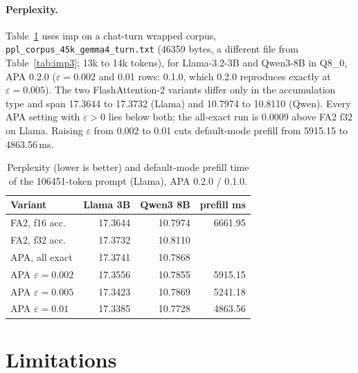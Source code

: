 \documentclass[10pt,twocolumn]{article}
\newcommand{\eps}{\varepsilon}
\newcommand{\code}[1]{\texttt{#1}}
\begin{document}
\paragraph{Perplexity.} Table~\ref{tab:ppl} uses imp on a chat-turn wrapped corpus,
\code{ppl\_corpus\_45k\_gemma4\_turn.txt} (46359 bytes, a different file from Table~\ref{tab:imp3}; 13k to 14k tokens), for Llama-3.2-3B
and Qwen3-8B \cite{yang2025qwen3} in Q8\_0, APA 0.2.0 ($\eps=0.002$ and 0.01 rows: 0.1.0, which 0.2.0
reproduces exactly at $\eps=0.005$). The two FlashAttention-2 variants differ only in the accumulation type
and span 17.3644 to 17.3732 (Llama) and 10.7974 to 10.8110 (Qwen). Every APA setting with $\eps>0$ lies
below both; the all-exact run is 0.0009 above FA2 f32 on Llama. Raising $\eps$ from 0.002 to 0.01 cuts
default-mode prefill from 5915.15 to 4863.56\,ms.

\begin{table}[t]
\centering\small
\begin{tabular}{@{}lrrr@{}}
\toprule
Variant & Llama 3B & Qwen3 8B & prefill ms \\
\midrule
FA2, f16 acc. & 17.3644 & 10.7974 & 6661.95 \\
FA2, f32 acc. & 17.3732 & 10.8110 & \\
APA, all exact & 17.3741 & 10.7868 & \\
APA $\eps=0.002$ & 17.3556 & 10.7855 & 5915.15 \\
APA $\eps=0.005$ & 17.3423 & 10.7869 & 5241.18 \\
APA $\eps=0.01$ & 17.3385 & 10.7728 & 4863.56 \\
\bottomrule
\end{tabular}
\caption{Perplexity (lower is better) and default-mode prefill time of the 106451-token prompt (Llama),
APA 0.2.0 / 0.1.0.}
\label{tab:ppl}
\end{table}

\section{Limitations}
\label{sec:limits}
\end{document}
